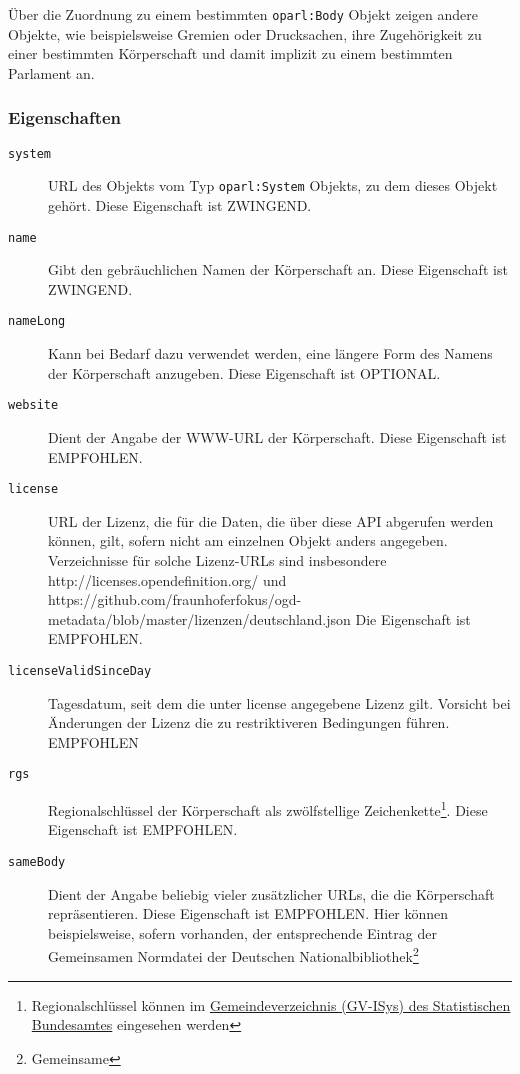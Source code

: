 \documentclass[,a4paper]{article}
\begin{document}
Über die Zuordnung zu einem bestimmten \texttt{oparl:Body} Objekt zeigen
andere Objekte, wie beispielsweise Gremien oder Drucksachen, ihre
Zugehörigkeit zu einer bestimmten Körperschaft und damit implizit zu
einem bestimmten Parlament an.

\subsubsection{Eigenschaften}\label{eigenschaften-1}

\begin{description}
\item[\texttt{system}]
URL des Objekts vom Typ \texttt{oparl:System} Objekts, zu dem dieses
Objekt gehört. Diese Eigenschaft ist ZWINGEND.
\item[\texttt{name}]
Gibt den gebräuchlichen Namen der Körperschaft an. Diese Eigenschaft ist
ZWINGEND.
\item[\texttt{nameLong}]
Kann bei Bedarf dazu verwendet werden, eine längere Form des Namens der
Körperschaft anzugeben. Diese Eigenschaft ist OPTIONAL.
\item[\texttt{website}]
Dient der Angabe der WWW-URL der Körperschaft. Diese Eigenschaft ist
EMPFOHLEN.
\item[\texttt{license}]
URL der Lizenz, die für die Daten, die über diese API abgerufen werden
können, gilt, sofern nicht am einzelnen Objekt anders angegeben.
Verzeichnisse für solche Lizenz-URLs sind insbesondere
http://licenses.opendefinition.org/ und
https://github.com/fraunhoferfokus/ogd-metadata/blob/master/lizenzen/deutschland.json
Die Eigenschaft ist EMPFOHLEN.
\item[\texttt{licenseValidSinceDay}]
Tagesdatum, seit dem die unter license angegebene Lizenz gilt. Vorsicht
bei Änderungen der Lizenz die zu restriktiveren Bedingungen führen.
EMPFOHLEN
\item[\texttt{rgs}]
Regionalschlüssel der Körperschaft als zwölfstellige
Zeichenkette\footnote{Regionalschlüssel können im
  \href{https://www.destatis.de/DE/ZahlenFakten/LaenderRegionen/Regionales/Gemeindeverzeichnis/Gemeindeverzeichnis.html}{Gemeindeverzeichnis
  (GV-ISys) des Statistischen Bundesamtes} eingesehen werden}. Diese
Eigenschaft ist EMPFOHLEN.
\item[\texttt{sameBody}]
Dient der Angabe beliebig vieler zusätzlicher URLs, die die Körperschaft
repräsentieren. Diese Eigenschaft ist EMPFOHLEN. Hier können
beispielsweise, sofern vorhanden, der entsprechende Eintrag der
Gemeinsamen Normdatei der Deutschen Nationalbibliothek\footnote{Gemeinsame
}
\end{description}
\end{document}
